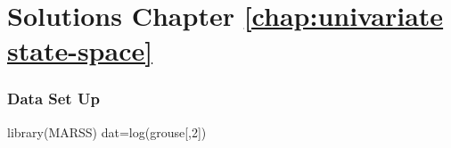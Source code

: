 
\chapter*{Solutions Chapter \ref{chap:univariate state-space}}

\subsection*{Data Set Up}
\begin{Schunk}
\begin{Sinput}
 library(MARSS)
 dat=log(grouse[,2])
\end{Sinput}
\end{Schunk}


